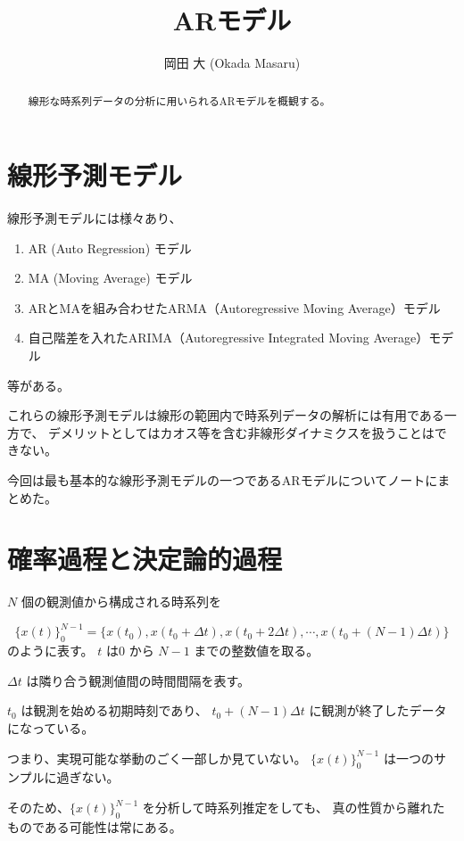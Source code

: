 \documentclass[uplatex,a4j,12pt,dvipdfmx]{jsarticle}
\title{
ARモデル
}
\author{
岡田 大 (Okada Masaru)
}
\begin{document}
\maketitle

\begin{abstract}
	線形な時系列データの分析に用いられるARモデルを概観する。
\end{abstract}

\section{線形予測モデル}

線形予測モデルには様々あり、

\begin{enumerate}
	\item AR (Auto Regression) モデル
	\item MA (Moving Average) モデル
	\item ARとMAを組み合わせたARMA（Autoregressive Moving Average）モデル
	\item 自己階差を入れたARIMA（Autoregressive Integrated Moving Average）モデル
\end{enumerate}

等がある。

これらの線形予測モデルは線形の範囲内で時系列データの解析には有用である一方で、
デメリットとしてはカオス等を含む非線形ダイナミクスを扱うことはできない。

今回は最も基本的な線形予測モデルの一つであるARモデルについてノートにまとめた。


\section{確率過程と決定論的過程}

$N$ 個の観測値から構成される時系列を

\[
	\{ x(t) \}^{N-1}_{0} = \{ x(t_{0}), x(t_{0} + \Delta t) , x(t_{0} + 2\Delta t) , \cdots , x(t_{0} +  (N-1) \Delta t) \}
\]
のように表す。
$t$ は$0$ から $N-1$ までの整数値を取る。

$\Delta t$ は隣り合う観測値間の時間間隔を表す。

$t_{0}$ は観測を始める初期時刻であり、
$t_{0} +  (N-1) \Delta t$ に観測が終了したデータになっている。

つまり、実現可能な挙動のごく一部しか見ていない。
$\{ x(t) \}^{N-1}_{0}$ は一つのサンプルに過ぎない。

そのため、$\{ x(t) \}^{N-1}_{0}$ を分析して時系列推定をしても、
真の性質から離れたものである可能性は常にある。
\end{document}
